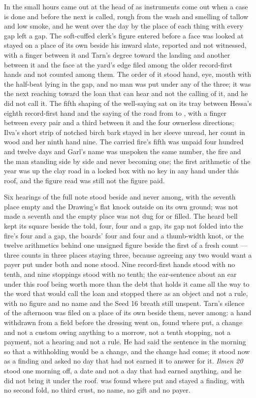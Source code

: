 \scenebreak

In the small hours  came out at the head of  as instruments come out when a case is done and before the next is called, rough from the wash and smelling of tallow and low smoke, and he went over the day by the place of each thing with every gap left a gap. The soft-cuffed clerk's figure entered before a face was looked at stayed on a place of its own beside his inward slate, reported and not witnessed, with a finger between it and Tarn's degree toward the landing and another between it and the face at the yard's edge filed among the older record-first hands and not counted among them. The order of it stood hand, eye, mouth with the half-beat lying in the gap, and no man was put under any of the three; it was the next reaching toward the loan that can hear and not the calling of it, and he did not call it. The fifth shaping of the well-saying sat on its tray between Hessa's eighth record-first hand and the saying of the road from  to , with a finger between every pair and a third between it and the four ownerless directions; Ilva's short strip of notched birch bark stayed in her sleeve unread, her count in wood and her ninth hand nine. The carried fire's fifth was unpaid four hundred and twelve days and Garl's name was unspoken the same number, the fire and the man standing side by side and never becoming one; the first arithmetic of the year was up the clay road in a locked box with no key in any hand under this roof, and the figure read was still not the figure paid.

Six hearings of the full note stood beside and never among, with the seventh place empty and the Drawing's flat knock outside on its own ground;  was not made a seventh and the empty place was not dug for or filled. The heard bell kept its square beside the told, four, four and a gap, its gap not folded into the fire's four and a gap, the boards' four and four and a thumb-width knot, or the twelve arithmetics behind one unsigned figure beside the first of a fresh count --- three counts in three places staying three, because agreeing any two would want a payer put under both and none stood. Nine record-first hands stood with no tenth, and nine stoppings stood with no tenth; the ear-sentence about an ear under this roof being worth more than the debt that holds it came all the way to the word that would call the loan and stopped there as an object and not a rule, with no figure and no name and the Seed 16 breath still unspent. Tarn's silence of the afternoon was filed on a place of its own beside them, never among: a hand withdrawn from a field before the dressing went on, found where put, a change and not a custom owing anything to a morrow, not a tenth stopping, not a payment, not a hearing and not a rule. He had said the sentence in the morning so that a withholding would be a change, and the change had come; it stood now as a finding and asked no day that had not earned it to answer for it. \emph{Ilmen 20} stood one morning off, a date and not a day that had earned anything, and he did not bring it under the roof.  was found where put and stayed a finding, with no second fold, no third crust, no name, no gift and no payer.

